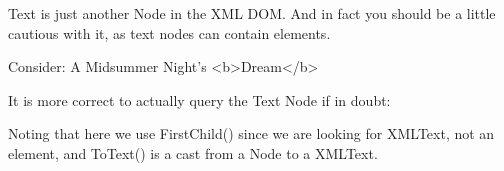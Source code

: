 Text is just another Node in the X\+ML D\+OM. And in fact you should be a little cautious with it, as text nodes can contain elements.

\begin{DoxyVerb}Consider: A Midsummer Night's <b>Dream</b>
\end{DoxyVerb}


It is more correct to actually query the Text Node if in doubt\+:


\begin{DoxyCodeInclude}{0}

\end{DoxyCodeInclude}


Noting that here we use First\+Child() since we are looking for X\+M\+L\+Text, not an element, and To\+Text() is a cast from a Node to a X\+M\+L\+Text. 